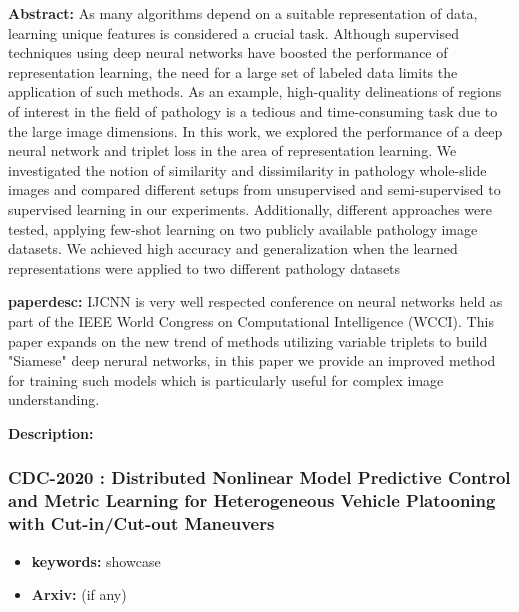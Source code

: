 \documentclass{article}
\begin{document}

\textbf{Abstract:} As many algorithms depend on a suitable representation of data, learning
unique features is considered a crucial task. Although supervised techniques
using deep neural networks have boosted the performance of representation
learning, the need for a large set of labeled data limits the application of
such methods. As an example, high-quality delineations of regions of interest
in the field of pathology is a tedious and time-consuming task due to the large
image dimensions. In this work, we explored the performance of a deep neural
network and triplet loss in the area of representation learning. We
investigated the notion of similarity and dissimilarity in pathology
whole-slide images and compared different setups from unsupervised and
semi-supervised to supervised learning in our experiments. Additionally,
different approaches were tested, applying few-shot learning on two publicly
available pathology image datasets. We achieved high accuracy and
generalization when the learned representations were applied to two different
pathology datasets

\textbf{paperdesc:} IJCNN is very well respected conference on neural networks held as part of the IEEE World Congress on Computational Intelligence (WCCI). This paper expands on the new trend of methods utilizing variable triplets to build "Siamese" deep nerural networks, in this paper we provide an improved method for training such models which is particularly useful for complex image understanding.

\textbf{Description:} 



\newpage
\subsubsection{\textbf{CDC-2020} : Distributed Nonlinear Model Predictive Control and Metric Learning for Heterogeneous Vehicle Platooning with Cut-in/Cut-out Maneuvers}
\begin{itemize}
\item \textbf{keywords:} showcase
\item \textbf{Arxiv:}  (if any)
\end{itemize}
\end{document}
